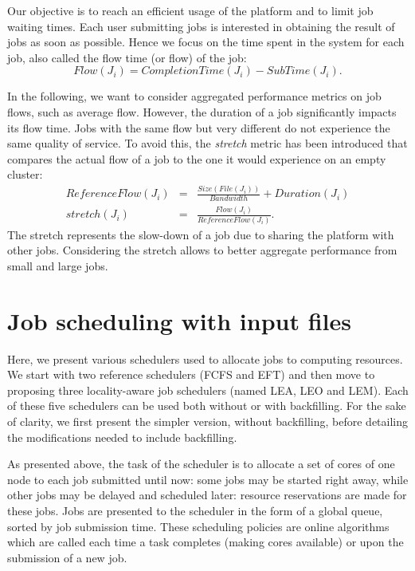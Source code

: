 \documentclass[sigconf,review,anonymous]{acmart}
\newcommand{\rev}[1]{{\color{black}{#1}}}
\newcommand{\file}{\ensuremath{\mathit{File}}\xspace}
\newcommand{\size}{\ensuremath{\mathit{Size}}\xspace}
\newcommand{\duration}{\mathit{Duration}\xspace}
\newcommand{\bandwidth}{\mathit{Bandwidth}\xspace}
\newcommand{\submissiontime}{\mathit{SubTime}\xspace}
\newcommand{\emptyflow}{\mathit{ReferenceFlow}\xspace}
\newcommand{\completiontime}{\mathit{CompletionTime}\xspace}
\newcommand{\start}{\mathit{StartTime}\xspace}
\newcommand{\us}{\ensuremath{\mathit{user~session}}\xspace}
\begin{document}
Our objective is to reach an efficient usage of the platform and to
limit job waiting times. Each
user submitting jobs is interested in obtaining the result of jobs
as soon as possible. Hence we focus on the time spent in the system
for each job, also called the flow time (or flow) of the job:
$$
\mathit{Flow}(J_i) = \completiontime(J_i) - \submissiontime(J_i).
$$

In the following, we want to consider aggregated performance metrics on
job flows, such as average flow. However, the duration
of a job significantly impacts its flow time. Jobs with the same
flow but very different \rev{durations} do not experience the same quality
of service. To avoid this, the \emph{stretch} metric has been
introduced that compares the actual flow of a job to the one it would
experience on an empty cluster:
\begin{eqnarray*}
\emptyflow(J_i) &=& \frac{\size(\file(J_i))}{\bandwidth} + \duration(J_i)\\
\mathit{stretch}(J_i) &=& \frac{\mathit{Flow}(J_i)}{\emptyflow(J_i)}.
\end{eqnarray*}
The stretch represents the slow-down of a job due to sharing the
platform with other jobs. Considering the stretch
allows to better aggregate performance from small and large jobs.


\section{Job scheduling with input files}\label{sec.schedulers}


Here, we present various schedulers used to allocate jobs to
computing resources. We start with two reference schedulers (FCFS and EFT)
and then move to proposing three locality-aware job schedulers (named
LEA, LEO and LEM). Each of these five schedulers can be used both
without or with backfilling. For the sake of clarity, we first present
the simpler version, without backfilling, before detailing the
modifications needed to include backfilling.

As presented above, the task of the scheduler is to allocate a set of
cores of one node
to each job submitted until now: some jobs may be started right away,
while other jobs may be delayed and scheduled later: resource
reservations are made for these jobs. Jobs are presented to the
scheduler in the form of a global queue, sorted by job submission
time. These scheduling policies are online algorithms which are called each time
a task completes (making cores available) or upon the submission of
a new job.
\end{document}
